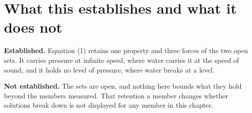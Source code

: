 \section{What this establishes and what it does not}

\textbf{Established.} Equation (1) retains one property and three forces of the two open sets. It
carries pressure at infinite speed, where water carries it at the speed of sound, and it holds no
level of pressure, where water breaks at a level.

\textbf{Not established.} The sets are open, and nothing here bounds what they hold beyond the
members measured. That retention a member changes whether solutions break down is not displayed for any
member in this chapter.
